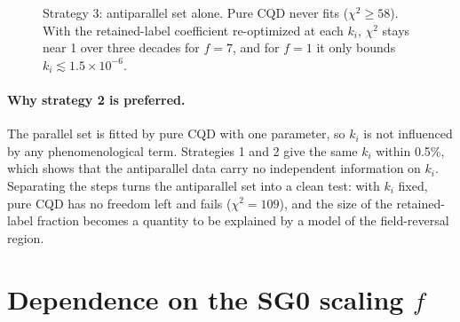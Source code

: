 \begin{figure}[h]
\centering
{}
\caption{Strategy 3: antiparallel set alone. Pure CQD never fits ($\chi^2\ge58$). With the retained-label
coefficient re-optimized at each $k_i$, $\chi^2$ stays near 1 over three decades for $f=7$, and for
$f=1$ it only bounds $k_i\lesssim1.5\times10^{-6}$.}
\label{fig:strategies}
\end{figure}

\paragraph{Why strategy 2 is preferred.} The parallel set is fitted by pure CQD with one parameter, so
$k_i$ is not influenced by any phenomenological term. Strategies 1 and 2 give the same $k_i$ within
0.5\%, which shows that the antiparallel data carry no independent information on $k_i$. Separating
the steps turns the antiparallel set into a clean test: with $k_i$ fixed, pure CQD has no freedom left
and fails ($\chi^2=109$), and the size of the retained-label fraction becomes a quantity to be
explained by a model of the field-reversal region.

\section{Dependence on the SG0 scaling \texorpdfstring{$f$}{f}}
\label{sec:fscan}

